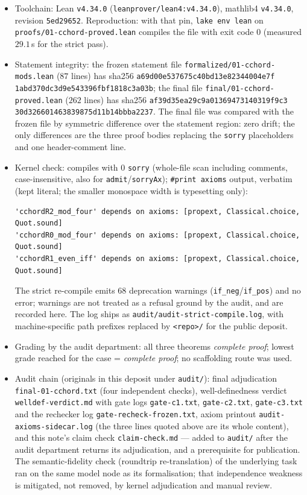 \documentclass[11pt]{article}
\theoremstyle{definition}
\begin{document}
\begin{itemize}
\item Toolchain: Lean \texttt{v4.34.0} (\texttt{leanprover/lean4:v4.34.0}),
mathlib4 \texttt{v4.34.0}, revision \texttt{5ed29652}. Reproduction: with that
pin, \texttt{lake env lean} on \texttt{proofs/01-cchord-proved.lean} compiles
the file with exit code $0$ (measured $29.1$\,s for the strict pass).
\item Statement integrity: the frozen statement file
\texttt{formalized/01-cchord-mods.lean} ($87$ lines) has sha256
\texttt{a69d00e537675c40bd13e82344004e7f}\allowbreak
\texttt{1abd370dc3d9e543396fbf1818c3a03b}; the
final file \texttt{final/01-cchord-proved.lean} ($262$ lines) has sha256
\texttt{af39d35ea29c9a01369473140319f9c3}\allowbreak
\texttt{30d326601463839875d11b14bbba2237}.
The final file was compared with the frozen file by symmetric difference over
the statement region: zero drift; the only differences are the three proof
bodies replacing the \texttt{sorry} placeholders and one header-comment line.
\item Kernel check: compiles with $0$ \texttt{sorry} (whole-file scan including
comments, case-insensitive, also for \texttt{admit}/\texttt{sorryAx});
\texttt{\#print axioms} output, verbatim (kept literal; the smaller monospace
width is typesetting only):
\begin{lstlisting}[basicstyle=\ttfamily\footnotesize,frame=none]
'cchordR2_mod_four' depends on axioms: [propext, Classical.choice, Quot.sound]
'cchordR0_mod_four' depends on axioms: [propext, Classical.choice, Quot.sound]
'cchordR1_even_iff' depends on axioms: [propext, Classical.choice, Quot.sound]
\end{lstlisting}
The strict re-compile emits $68$ deprecation warnings
(\texttt{if\_neg}/\texttt{if\_pos}) and no error; warnings are not treated as a
refusal ground by the audit, and are recorded here. The log ships as
\texttt{audit/audit-strict-compile.log}, with machine-specific path prefixes
replaced by \texttt{<repo>/} for the public deposit.
\item Grading by the audit department: all three theorems
\emph{complete proof}; lowest grade reached for the case = \emph{complete
proof}; no scaffolding route was used.
\item Audit chain (originals in this deposit under \texttt{audit/}): final
adjudication \texttt{final-01-cchord.txt} (four independent checks),
well-definedness verdict \texttt{welldef-verdict.md} with gate logs
\texttt{gate-c1.txt}, \texttt{gate-c2.txt}, \texttt{gate-c3.txt} and the
rechecker log \texttt{gate-recheck-frozen.txt}, axiom printout
\texttt{audit-axioms-sidecar.log} (the three lines quoted above are its whole
content), and this note's claim check \texttt{claim-check.md} --- added to
\texttt{audit/} after the audit department returns its adjudication, and a
prerequisite for publication. The semantic-fidelity check (roundtrip
re-translation) of the underlying task ran on the same model node as its
formalisation; that independence weakness is mitigated, not removed, by kernel
adjudication and manual review.
\end{itemize}
\end{document}
